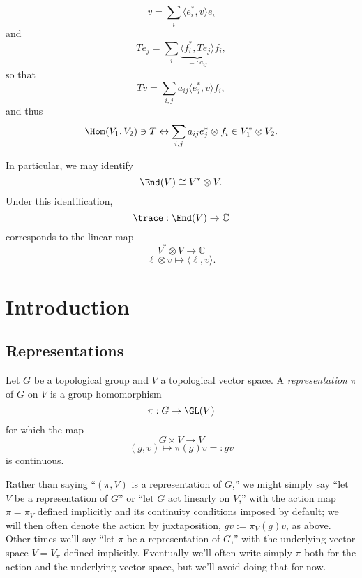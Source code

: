 \documentclass[reqno]{amsart} 
\begin{document}
\begin{equation*}
  v = \sum_i \langle e_i^*, v \rangle e_i
\end{equation*}
and
\begin{equation*}
  T e_j = \sum_i \underbrace{ \langle f_i^*, T e_j \rangle }_{=: a_{ij} } f_i,
\end{equation*}
so that
\begin{equation*}
  T v = \sum_{i,j} a_{i j} \langle e_j^*, v \rangle f_i,
\end{equation*}
and thus
\begin{equation*}
  \Hom(V_1,V_2) \ni T \leftrightarrow \sum_{i,j} a_{i j} e_j^* \otimes f_i \in V_1^* \otimes V_2.
\end{equation*}

In particular, we may identify
\begin{equation*}
  \End(V) \cong V^* \otimes V.
\end{equation*}
Under this identification,
\begin{equation*}
  \trace : \End(V) \rightarrow \mathbb{C}
\end{equation*}
corresponds to the linear map
\begin{equation*}
  V^* \otimes V \rightarrow \mathbb{C}
\end{equation*}
\begin{equation*}
  \ell \otimes v \mapsto \langle \ell, v \rangle.
\end{equation*}

\newpage


\section{Introduction}\label{sec:cnh2vn8z8o}
\subsection{Representations}
\begin{definition}
  Let $G$ be a topological group and $V$ a topological vector space.  A \emph{representation} $\pi$ of $G$ on $V$ is a group homomorphism
  \begin{equation*}
    \pi : G \rightarrow \GL(V)
  \end{equation*}
  for which the map
  \begin{equation*}
    G \times V \rightarrow V
  \end{equation*}
  \begin{equation*}
    (g,v) \mapsto \pi(g) v =: g v
  \end{equation*}
  is continuous.
\end{definition}
Rather than saying ``$(\pi,V)$ is a representation of $G$,'' we might simply say ``let $V$ be a representation of $G$'' or ``let $G$ act linearly on $V$,'' with the action map $\pi = \pi_V$ defined implicitly and its continuity conditions imposed by default; we will then often denote the action by juxtaposition, $g v := \pi_V(g) v$, as above.  Other times we'll say ``let $\pi$ be a representation of $G$,'' with the underlying vector space $V = V_\pi$ defined implicitly.  Eventually we'll often write simply $\pi$ both for the action and the underlying vector space, but we'll avoid doing that for now.
\end{document}
